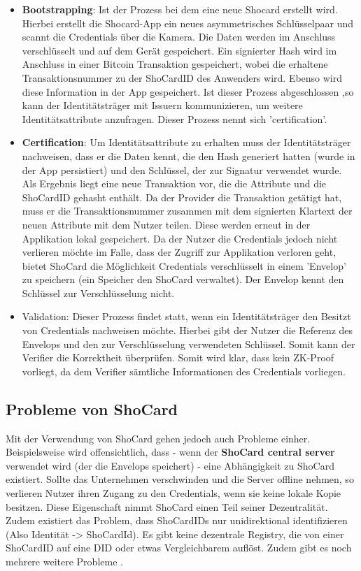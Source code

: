 \begin{itemize}
	\item \textbf{Bootstrapping}: Ist der Prozess bei dem eine neue Shocard erstellt wird. Hierbei erstellt die Shocard-App ein neues asymmetrisches Schlüsselpaar und scannt die Credentials über die Kamera. Die Daten werden im Anschluss verschlüsselt und auf dem Gerät gespeichert. Ein signierter Hash wird im Anschluss in einer Bitcoin Transaktion gespeichert, wobei die erhaltene Transaktionsnummer zu der ShoCardID des Anwenders wird. Ebenso wird diese Information in der App gespeichert. Ist dieser Prozess abgeschlossen ,so kann der Identitätsträger mit Issuern kommunizieren, um weitere Identitätsattribute anzufragen. Dieser Prozess nennt sich 'certification'.
	\item \textbf{Certification}: Um Identitätsattribute zu erhalten muss der Identitätsträger nachweisen, dass er die Daten kennt, die den Hash generiert hatten (wurde in der App persistiert) und den Schlüssel, der zur Signatur verwendet wurde. Als Ergebnis liegt eine neue Transaktion vor, die die Attribute und die ShoCardID gehasht enthält. Da der Provider die Transaktion getätigt hat, muss er die Transaktionsnummer zusammen mit dem signierten Klartext der neuen Attribute mit dem Nutzer teilen. Diese werden erneut in der Applikation lokal gespeichert. Da der Nutzer die Credentials jedoch nicht verlieren möchte im Falle, dass der Zugriff zur Applikation verloren geht, bietet ShoCard die Möglichkeit Credentials verschlüsselt in einem 'Envelop' zu speichern (ein Speicher den ShoCard verwaltet). Der Envelop kennt den Schlüssel zur Verschlüsselung nicht.
	\item Validation: Dieser Prozess findet statt, wenn ein Identitätsträger den Besitzt von Credentials nachweisen möchte. Hierbei gibt der Nutzer die Referenz des Envelops und den zur Verschlüsselung verwendeten Schlüssel. Somit kann der Verifier die Korrektheit überprüfen. Somit wird klar, dass kein ZK-Proof vorliegt, da dem Verifier sämtliche Informationen des Credentials vorliegen.	
\end{itemize}

\subsection{Probleme von ShoCard}
\label{shocard}
Mit der Verwendung von ShoCard gehen jedoch auch Probleme einher. Beispielsweise wird offensichtlich, dass - wenn der \textbf{ShoCard central server} verwendet wird (der die Envelops speichert) - eine Abhängigkeit zu ShoCard existiert. Sollte das Unternehmen verschwinden und die Server offline nehmen, so verlieren Nutzer ihren Zugang zu den Credentials, wenn sie keine lokale Kopie besitzen. Diese Eigenschaft nimmt ShoCard einen Teil seiner Dezentralität. Zudem existiert das Problem, dass ShoCardIDs nur unidirektional identifizieren (Also Identität -> ShoCardId). Es gibt keine dezentrale Registry, die von einer ShoCardID auf eine DID oder etwas Vergleichbarem auflöst. Zudem gibt es noch mehrere weitere Probleme \cite{ID46}.